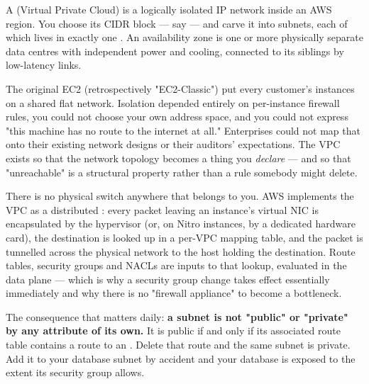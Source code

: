  A  (Virtual Private Cloud) is a logically isolated IP network inside an AWS region. You choose its CIDR block --- say  --- and carve it into subnets, each of which lives in exactly one . An availability zone is one or more physically separate data centres with independent power and cooling, connected to its siblings by low-latency links.

 The original EC2 (retrospectively "EC2-Classic") put every customer's instances on a shared flat network. Isolation depended entirely on per-instance firewall rules, you could not choose your own address space, and you could not express "this machine has no route to the internet at all." Enterprises could not map that onto their existing network designs or their auditors' expectations. The VPC exists so that the network topology becomes a thing you \emph{declare} --- and so that "unreachable" is a structural property rather than a rule somebody might delete.

 There is no physical switch anywhere that belongs to you. AWS implements the VPC as a distributed : every packet leaving an instance's virtual NIC is encapsulated by the hypervisor (or, on Nitro instances, by a dedicated hardware card), the destination is looked up in a per-VPC mapping table, and the packet is tunnelled across the physical network to the host holding the destination. Route tables, security groups and NACLs are inputs to that lookup, evaluated in the data plane --- which is why a security group change takes effect essentially immediately and why there is no "firewall appliance" to become a bottleneck.

The consequence that matters daily: \textbf{a subnet is not "public" or "private" by any attribute of its own.} It is public if and only if its associated route table contains a route to an . Delete that route and the same subnet is private. Add it to your database subnet by accident and your database is exposed to the extent its security group allows.

